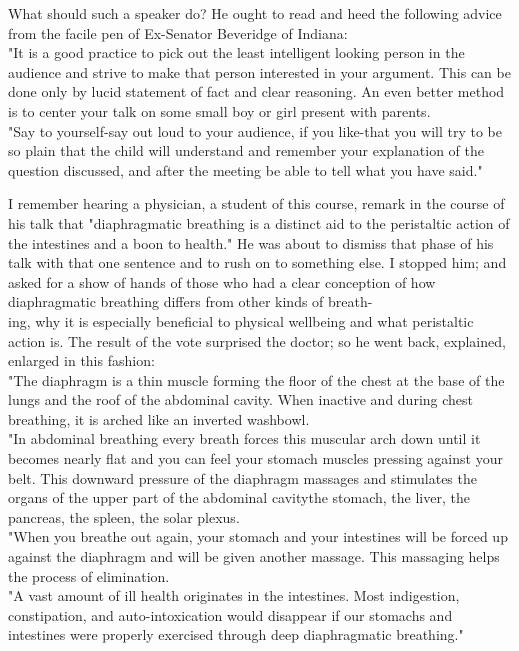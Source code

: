 \documentclass[10pt]{article}
\begin{document}
What should such a speaker do? He ought to read and heed the following advice from the facile pen of Ex-Senator Beveridge of Indiana:\\
"It is a good practice to pick out the least intelligent looking person in the audience and strive to make that person interested in your argument. This can be done only by lucid statement of fact and clear reasoning. An even better method is to center your talk on some small boy or girl present with parents.\\
"Say to yourself-say out loud to your audience, if you like-that you will try to be so plain that the child will understand and remember your explanation of the question discussed, and after the meeting be able to tell what you have said."

I remember hearing a physician, a student of this course, remark in the course of his talk that "diaphragmatic breathing is a distinct aid to the peristaltic action of the intestines and a boon to health." He was about to dismiss that phase of his talk with that one sentence and to rush on to something else. I stopped him; and asked for a show of hands of those who had a clear conception of how diaphragmatic breathing differs from other kinds of breath-\\
ing, why it is especially beneficial to physical wellbeing and what peristaltic action is. The result of the vote surprised the doctor; so he went back, explained, enlarged in this fashion:\\
"The diaphragm is a thin muscle forming the floor of the chest at the base of the lungs and the roof of the abdominal cavity. When inactive and during chest breathing, it is arched like an inverted washbowl.\\
"In abdominal breathing every breath forces this muscular arch down until it becomes nearly flat and you can feel your stomach muscles pressing against your belt. This downward pressure of the diaphragm massages and stimulates the organs of the upper part of the abdominal cavitythe stomach, the liver, the pancreas, the spleen, the solar plexus.\\
"When you breathe out again, your stomach and your intestines will be forced up against the diaphragm and will be given another massage. This massaging helps the process of elimination.\\
"A vast amount of ill health originates in the intestines. Most indigestion, constipation, and auto-intoxication would disappear if our stomachs and intestines were properly exercised through deep diaphragmatic breathing."
\end{document}
